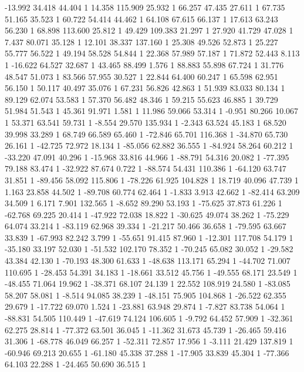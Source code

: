 	-13.992 34.418 44.404 1
	14.358 115.909 25.932 1
	66.257 47.435 27.611 1
	67.735 51.165 35.523 1
	60.722 54.414 44.462 1
	64.108 67.615 66.137 1
	17.613 63.243 56.230 1
	68.898 113.600 25.812 1
	49.429 109.383 21.297 1
	27.920 41.729 47.028 1
	7.437 80.071 35.128 1
	12.101 38.337 137.160 1
	25.308 49.526 52.873 1
	25.227 55.777 56.522 1
	49.194 58.528 54.844 1
	22.368 57.989 57.187 1
	71.872 52.443 8.113 1
	-16.622 64.527 32.687 1
	43.465 88.499 1.576 1
	88.883 55.898 67.724 1
	31.776 48.547 51.073 1
	83.566 57.955 30.527 1
	22.844 64.400 60.247 1
	65.598 62.951 56.150 1
	50.117 40.497 35.076 1
	67.231 56.826 42.863 1
	51.939 83.033 80.134 1
	89.129 62.074 53.583 1
	57.370 56.482 48.346 1
	59.215 55.623 46.885 1
	39.729 51.984 51.543 1
	45.361 91.971 1.581 1
	11.986 59.066 53.314 1
	-0.951 80.266 10.067 1
	53.371 63.541 59.731 1
	-8.554 29.570 135.934 1
	-2.343 63.524 45.183 1
	68.520 39.998 33.289 1
	68.749 66.589 65.460 1
	-72.846 65.701 116.368 1
	-34.870 65.730 26.161 1
	-42.725 72.972 18.134 1
	-85.056 62.882 36.555 1
	-84.924 58.264 60.212 1
	-33.220 47.091 40.296 1
	-15.968 33.816 44.966 1
	-88.791 54.316 20.082 1
	-77.395 79.188 83.474 1
	-32.922 87.674 0.722 1
	-88.574 54.431 110.386 1
	-64.120 63.747 31.851 1
	-89.456 58.092 115.806 1
	-78.226 61.925 104.828 1
	18.719 40.096 47.739 1
	1.163 23.858 44.502 1
	-89.708 60.774 62.464 1
	-1.833 3.913 42.662 1
	-82.414 63.209 34.509 1
	6.171 7.901 132.565 1
	-8.652 89.290 53.193 1
	-75.625 37.873 61.226 1
	-62.768 69.225 20.414 1
	-47.922 72.038 18.822 1
	-30.625 49.074 38.262 1
	-75.229 64.074 33.214 1
	-83.119 62.968 39.334 1
	-21.217 50.466 36.658 1
	-79.595 63.667 33.839 1
	-67.993 82.242 3.799 1
	-55.651 91.415 87.960 1
	-12.301 117.708 54.179 1
	-35.180 33.197 52.030 1
	-51.532 102.170 78.352 1
	-70.245 65.082 30.052 1
	-29.582 43.384 42.130 1
	-70.193 48.300 61.633 1
	-48.638 113.171 65.294 1
	-44.702 71.007 110.695 1
	-28.453 54.391 34.183 1
	-18.661 33.512 45.756 1
	-49.555 68.171 23.549 1
	-48.455 71.064 19.962 1
	-38.371 68.107 24.139 1
	22.552 108.919 24.580 1
	-83.085 58.207 58.081 1
	-8.514 94.085 38.239 1
	-48.151 75.905 104.868 1
	-26.522 62.355 29.679 1
	-17.722 69.070 1.524 1
	-23.881 63.948 29.874 1
	-7.827 83.738 54.064 1
	-88.831 54.505 110.449 1
	-47.619 74.124 106.605 1
	-9.792 64.452 57.909 1
	-32.361 62.275 28.814 1
	-77.372 63.501 36.045 1
	-11.362 31.673 45.739 1
	-26.465 59.416 31.306 1
	-68.778 46.049 66.257 1
	-52.311 72.857 17.956 1
	-3.111 21.429 137.819 1
	-60.946 69.213 20.655 1
	-61.180 45.338 37.288 1
	-17.905 33.839 45.304 1
	-77.366 64.103 22.288 1
	-24.465 50.690 36.515 1
